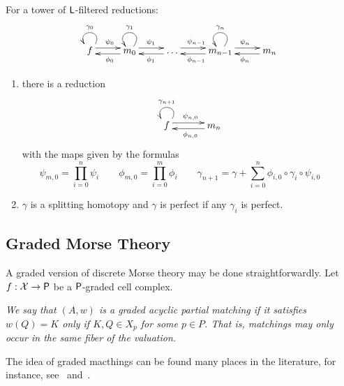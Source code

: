 \begin{prop}\label{prop:cont:tower}
For a tower of ${\mathsf L}$-filtered reductions:
\[
\xymatrixrowsep{0.03in}
\xymatrixcolsep{0.35in}
\xymatrix{
f  \ar@(ur,ul)_{\gamma_0} \ar[r]<3pt>^{\psi_0} & \ar[l]<3pt>^{\phi_0 } m_0 \ar@(ur,ul)_{\gamma_1} \ar[r]<3pt>^{\psi_1} & \ar[l]<3pt>^{\phi_1 }  \ldots \ar[r]<3pt>^{\psi_{n-1}}  & \ar[l]<3pt>^{\phi_{n-1} }m_{n-1} \ar@(ur,ul)_{\gamma_n}  \ar[r]<3pt>^{\psi_n} & \ar[l]<3pt>^{\phi_n} m_n
}
\]

\begin{enumerate}
\item there is a reduction 
\begin{align}\label{dia:cont:tower}
\xymatrixrowsep{0.03in}
\xymatrixcolsep{0.45in}
\xymatrix{
f  \ar@(ur,ul)_{\gamma_{n+1} } \ar[r]<3pt>^{\psi_{n,0}} & \ar[l]<3pt>^{\phi_{n,0}} m_n
}
\end{align}
with the maps given by the formulas
\[
 \psi_{m,0} = \prod_{i=0}^n \psi_i  \quad\quad  \phi_{m,0} = \prod_{i=0}^m \phi_i 
\quad\quad
\gamma_{n+1}= \gamma + \sum_{i=0}^n \phi_{i,0}\circ  \gamma_i\circ \psi_{i,0} \quad\quad 
\]

\item $\gamma$ is a splitting homotopy and $\gamma$ is perfect if any $\gamma_i$ is perfect.

\end{enumerate}
\end{prop}


\subsection{Graded Morse Theory}\label{sec:gmt}

A graded version of discrete Morse theory may be done straightforwardly.   Let $f:{\mathcal X}\to {\mathsf P}$ be a ${\mathsf P}$-graded cell complex.  
\begin{defn}
{\em
We say that $(A,w)$ is a {\em graded acyclic partial matching} if it satisfies $w(Q)=K$ only if $K,Q\in X_p$ for some $p\in P$.  That is, matchings may only occur in the same fiber of the valuation.  
}
\end{defn}

The idea of graded macthings can be found many places in the literature, for instance, see~\cite{mn} and~\cite[Patchwork Theorem]{koz}.

